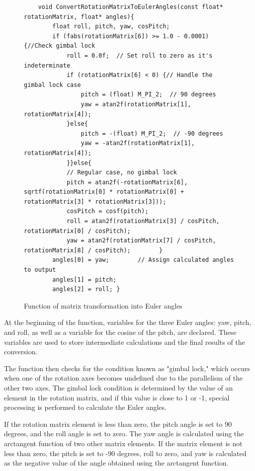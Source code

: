 \begin{figure}[H]
	\centering
	\begin{verbatim}
    void ConvertRotationMatrixToEulerAngles(const float* rotationMatrix, float* angles){
        float roll, pitch, yaw, cosPitch;
        if (fabs(rotationMatrix[6]) >= 1.0 - 0.0001){//Check gimbal lock
            roll = 0.0f;  // Set roll to zero as it's indeterminate
            if (rotationMatrix[6] < 0) {// Handle the gimbal lock case
                pitch = (float) M_PI_2;  // 90 degrees
                yaw = atan2f(rotationMatrix[1], rotationMatrix[4]);
            }else{
                pitch = -(float) M_PI_2;  // -90 degrees
                yaw = -atan2f(rotationMatrix[1], rotationMatrix[4]);
            }}else{
            // Regular case, no gimbal lock
            pitch = atan2f(-rotationMatrix[6], sqrtf(rotationMatrix[0] * rotationMatrix[0] + rotationMatrix[3] * rotationMatrix[3]));
            cosPitch = cosf(pitch);
            roll = atan2f(rotationMatrix[3] / cosPitch, rotationMatrix[0] / cosPitch);
            yaw = atan2f(rotationMatrix[7] / cosPitch, rotationMatrix[8] / cosPitch);        }
        angles[0] = yaw;        // Assign calculated angles to output
        angles[1] = pitch;
        angles[2] = roll; }
	\end{verbatim}
	\caption{Function of matrix transformation into Euler angles}\label{codeConvertRotationMatrixToEulerAngles}
\end{figure}
At the beginning of the function, variables for the three Euler angles: yaw, pitch, and roll, as well as a variable for the cosine of the pitch, are declared. These variables are used to store intermediate calculations and the final results of the conversion.

The function then checks for the condition known as "gimbal lock," which occurs when one of the rotation axes becomes undefined due to the parallelism of the other two axes. The gimbal lock condition is determined by the value of an element in the rotation matrix, and if this value is close to 1 or -1, special processing is performed to calculate the Euler angles.


If the rotation matrix element is less than zero, the pitch angle is set to 90 degrees, and the roll angle is set to zero. The yaw angle is calculated using the arctangent function of two other matrix elements. If the matrix element is not less than zero, the pitch is set to -90 degrees, roll to zero, and yaw is calculated as the negative value of the angle obtained using the arctangent function.


